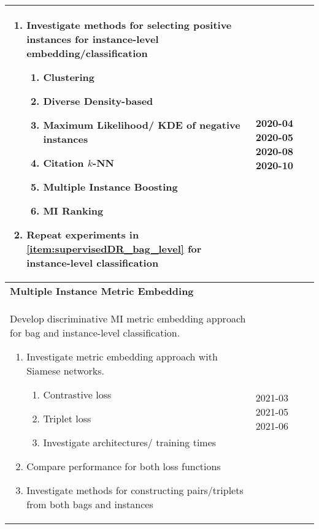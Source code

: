 \begin{longtable}{|p{10cm}|p{4cm}|}
\begin{enumerate}
		\item Investigate methods for selecting positive instances for instance-level  embedding/classification
		\begin{enumerate}
			\item Clustering
			\item Diverse Density-based
			\item Maximum Likelihood/ KDE of negative instances
			\item Citation $k$-NN
			\item Multiple Instance Boosting
			\item MI Ranking
		\end{enumerate}
	
		\item Repeat experiments in \ref{item:supervisedDR_bag_level} for instance-level classification
	\end{enumerate} & \newline \vspace{1cm} 2020-04 \newline \vspace{5.8cm} 2020-05 \newline \vspace{3.1cm} 2020-08 \newline \vspace{6cm} 2020-10\\ 
	\hline
	\multicolumn{2}{|l|}{\textbf{Multiple Instance Metric Embedding}} \\
	\hline
	Develop discriminative MI metric embedding approach for bag and instance-level classification. 
	\begin{enumerate}
		\item Investigate metric embedding approach with Siamese networks.
		\begin{enumerate}
			\item Contrastive loss
			\item Triplet loss
			\item Investigate architectures/ training times
		\end{enumerate}
		\item Compare performance for both loss functions
		\item Investigate methods for constructing pairs/triplets from both bags and instances 
	\end{enumerate} & \newline \vspace{1.1cm} 2021-03 \newline \vspace{3.1cm} 2021-05 \newline \vspace{0.1cm} 2021-06\\

\end{longtable}
